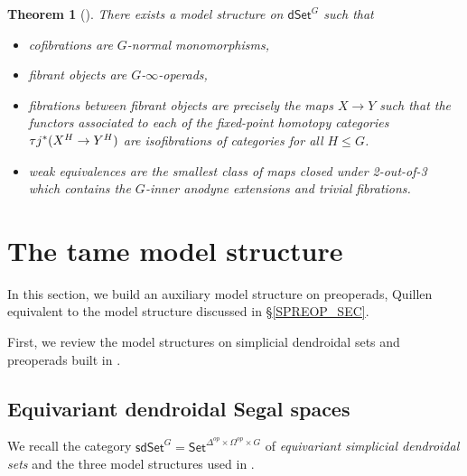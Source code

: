 \documentclass[a4paper,10pt
,draft
]{article}%
\numberwithin{equation}{section}
\numberwithin{figure}{section}
\newtheorem{theorem}[equation]{Theorem}%
\theoremstyle{definition} %
\newcommand{\Set}{\ensuremath{\mathsf{Set}}}
\newcommand{\dSet}{\mathsf{dSet}}
\newcommand{\1}{\ensuremath{\mathbbm 1}}%
\begin{document}
\begin{theorem}[{\cite[Thm 2.1, Thm 8.22]{Per18}}]
      There exists a model structure on $\dSet^G$ such that
      \begin{itemize}
      \item cofibrations are $G$-normal monomorphisms,
      \item fibrant objects are $G$-$\infty$-operads,
      \item fibrations between fibrant objects are precisely the maps $X \to Y$ such that the functors associated to each of the fixed-point homotopy categories $\tau j^{\**}(X^H \to Y^H)$ are isofibrations of categories for all $H \leq G$.
      \item weak equivalences are the smallest class of maps closed under 2-out-of-3 which
            contains the $G$-inner anodyne extensions and trivial fibrations.
      \end{itemize}
\end{theorem}
















\newpage







\section{The tame model structure}
\label{TAME_SEC}

In this section, we build an auxiliary model structure on preoperads, Quillen equivalent to the model structure discussed in \S \ref{SPREOP_SEC}.


First, we review the model structures on simplicial dendroidal sets and preoperads built in \cite{BP_edss}.


\subsection{Equivariant dendroidal Segal spaces}
\label{JT_SEC}

We recall the category $\mathsf{sdSet}^G = \Set^{\Delta^{op} \times \Omega^{op} \times G}$ of \textit{equivariant simplicial dendroidal sets} and the three model structures used in \cite{BP_edss}.
\end{document}
